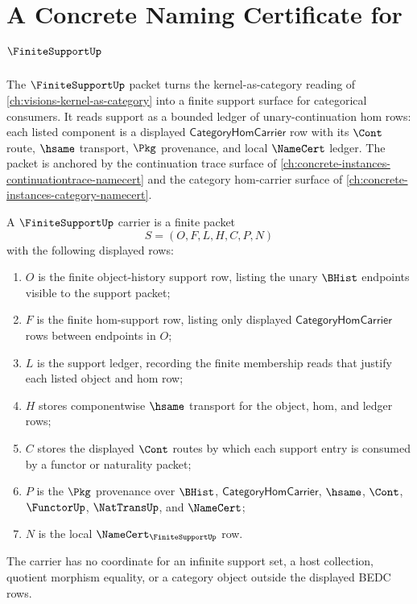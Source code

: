 \chapter{A Concrete Naming Certificate for $\FiniteSupportUp$}
\label{ch:concrete-instances-finitesupport-namecert}

The $\FiniteSupportUp$ packet turns the kernel-as-category reading of \autoref{ch:visions-kernel-as-category} into a finite support surface for categorical consumers. It reads support as a bounded ledger of unary-continuation hom rows: each listed component is a displayed $\mathsf{CategoryHomCarrier}$ row with its $\Cont$ route, $\hsame$ transport, $\Pkg$ provenance, and local $\NameCert$ ledger. The packet is anchored by the continuation trace surface of \autoref{ch:concrete-instances-continuationtrace-namecert} and the category hom-carrier surface of \autoref{ch:concrete-instances-category-namecert}.

\begin{definition}
\label{def:finite-support-carrier}
A $\FiniteSupportUp$ carrier is a finite packet
$$
S=(O,F,L,H,C,P,N)
$$
with the following displayed rows:
\begin{enumerate}
\item $O$ is the finite object-history support row, listing the unary $\BHist$ endpoints visible to the support packet;
\item $F$ is the finite hom-support row, listing only displayed $\mathsf{CategoryHomCarrier}$ rows between endpoints in $O$;
\item $L$ is the support ledger, recording the finite membership reads that justify each listed object and hom row;
\item $H$ stores componentwise $\hsame$ transport for the object, hom, and ledger rows;
\item $C$ stores the displayed $\Cont$ routes by which each support entry is consumed by a functor or naturality packet;
\item $P$ is the $\Pkg$ provenance over $\BHist$, $\mathsf{CategoryHomCarrier}$, $\hsame$, $\Cont$, $\FunctorUp$, $\NatTransUp$, and $\NameCert$;
\item $N$ is the local $\NameCert_{\FiniteSupportUp}$ row.
\end{enumerate}
The carrier has no coordinate for an infinite support set, a host collection, quotient morphism equality, or a category object outside the displayed BEDC rows.
\end{definition}

